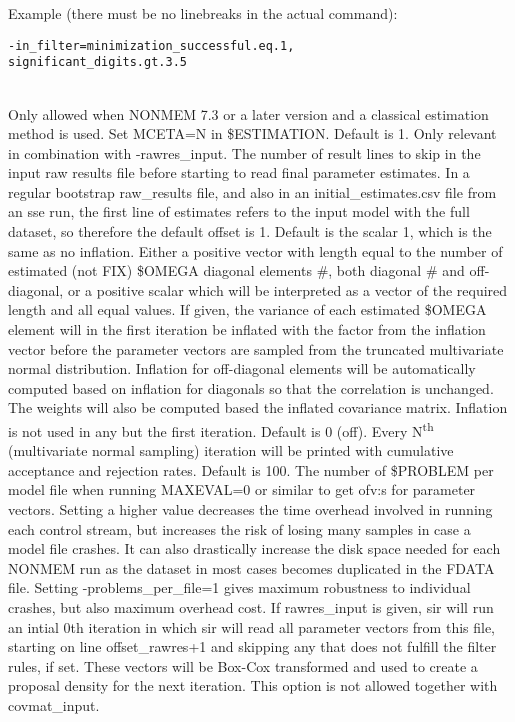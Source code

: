 \begin{optionlist}
Example (there must be no linebreaks in the actual command):
\begin{verbatim}
-in_filter=minimization_successful.eq.1,
significant_digits.gt.3.5
\end{verbatim} \\
\nextopt
{}
Only allowed when NONMEM 7.3 or a later version and a classical estimation method is used. Set MCETA=N in \$ESTIMATION.
\nextopt
{}
Default is 1. Only relevant in combination with -rawres\_input. The number of result lines to skip in the input raw results file before starting to read final parameter estimates. In a regular bootstrap raw\_results file, and also in an initial\_estimates.csv file from an sse run, the first line of estimates refers to the input model with the full dataset, so therefore the default offset is 1.
\nextopt
{}
Default is the scalar 1, which is the same as no inflation. Either a positive vector with length equal to the number of estimated (not FIX) \$OMEGA diagonal elements \#, both diagonal \# and off-diagonal, or a positive scalar which will be interpreted as a vector of the required length and all equal values. If given, the variance of each estimated \$OMEGA element will in the first iteration be inflated with the factor from the inflation vector before the parameter vectors are sampled from the truncated multivariate normal distribution. Inflation for off-diagonal elements will be automatically computed based on inflation for diagonals so that the correlation is unchanged. The weights will also be computed based the inflated covariance matrix. Inflation is not used in any but the first iteration.
\nextopt
{}
Default is 0 (off). Every N\textsuperscript{th} (multivariate normal sampling) iteration will be printed with cumulative acceptance and rejection rates.
\nextopt
{}
    Default is 100. The number of \$PROBLEM per model file when running
	MAXEVAL=0 or similar to get ofv:s for parameter vectors. Setting a higher
	value decreases the time overhead involved in running each control stream, but
	increases the risk of losing many samples in case a model file crashes. It
    can also drastically increase the disk space needed for each NONMEM run as the
    dataset in most cases becomes duplicated in the FDATA file.
	Setting -problems\_per\_file=1 gives maximum robustness to individual
	crashes, but also maximum overhead cost.
\nextopt
{}
If rawres\_input is given, sir will run an intial 0th iteration in which sir will read all parameter vectors from this file, starting on line offset\_rawres+1 and skipping any that does not fulfill the filter rules, if set. These vectors will be Box-Cox transformed and used to create a proposal density for the next iteration. This option is not allowed together with covmat\_input.


\end{optionlist}
